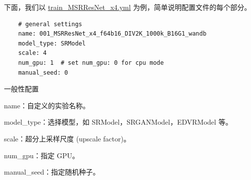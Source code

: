 \documentclass[../main.tex]{subfiles}
\begin{document}
    下面，我们以 \href{https://github.com/XPixelGroup/BasicSR/blob/master/options/train/SRResNet_SRGAN/train_MSRResNet_x4.yml}{train\_MSRResNet\_x4.yml} 为例，简单说明配置文件的每个部分。

    \begin{verbatim}
    # general settings
    name: 001_MSRResNet_x4_f64b16_DIV2K_1000k_B16G1_wandb
    model_type: SRModel
    scale: 4
    num_gpu: 1  # set num_gpu: 0 for cpu mode
    manual_seed: 0
    \end{verbatim}
    \begin{exampleBox}[righthand ratio=0.00, sidebyside, sidebyside align=center, lower separated=false]{一般性配置}

    name：自定义的实验名称。

    model\_type：选择模型，如 SRModel，SRGANModel，EDVRModel 等。

    scale：超分上采样尺度 (upscale factor)。

    num\_gpu：指定 GPU。

    manual\_seed：指定随机种子。
    \end{exampleBox}
\end{document}
